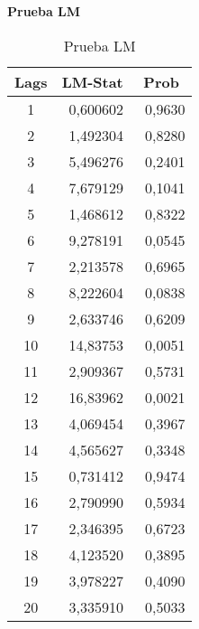 \begin{enumerate}
\textbf{Prueba LM}

\begin{table}[H]
\centering
\begin{tabular}{ccc}\hline\hline
Lags & LM-Stat & Prob \\ \hline\hline
1 & ~0,600602 & ~0,9630 \\
2 & ~1,492304 & ~0,8280 \\
3 & ~5,496276 & ~0,2401 \\
4 & ~7,679129 & ~0,1041 \\
5 & ~1,468612 & ~0,8322 \\
6 & ~9,278191 & ~0,0545 \\
7 & ~2,213578 & ~0,6965 \\
8 & ~8,222604 & ~0,0838 \\
9 & ~2,633746 & ~0,6209 \\
10& ~14,83753 & ~0,0051 \\
11& ~2,909367 & ~0,5731 \\
12& ~16,83962 & ~0,0021 \\
13& ~4,069454 & ~0,3967 \\
14& ~4,565627 & ~0,3348 \\
15& ~0,731412 & ~0,9474 \\
16& ~2,790990 & ~0,5934 \\
17& ~2,346395 & ~0,6723 \\
18& ~4,123520 & ~0,3895 \\
19& ~3,978227 & ~0,4090 \\
20& ~3,335910 & ~0,5033 \\\hline\hline
\end{tabular}
\caption{Prueba LM}
\label{tab38}
\end{table}


\end{enumerate}
